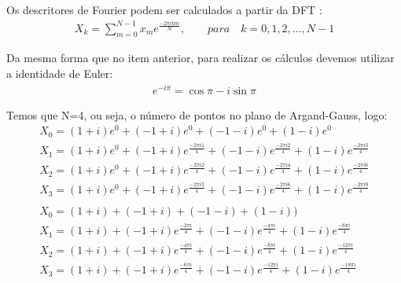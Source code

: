 \documentclass[12pt]{article}
\begin{document}
\begin{itemize}
\begin{itemize}
Os descritores de Fourier podem ser calculados a partir da DFT \cite{broughton2009discrete}:
\begin{align*}
    X_k = \sum\limits_{m=0}^{N-1} x_m e^{\frac{-2\pi ikm}{N}},\qquad para\quad k=0,1,2,...,N-1
\end{align*}

Da mesma forma que no item anterior, para realizar os cálculos devemos utilizar a identidade de Euler:
\begin{align*}
    e^{-i \pi} = \cos \pi - i\sin\pi
\end{align*}
	  
Temos que N=4, ou seja, o número de pontos no plano de Argand-Gauss, logo:
\begin{align*}
    &X_0 = (1 + i)e^0 + (-1 + i)e^0 + (-1 - i)e^0 + (1 - i)e^0 &\\
    &X_1 = (1 + i)e^0 + (-1 + i)e^{\frac{-2\pi i1}{4}} + (-1 - i)e^{\frac{-2\pi i2}{4}} + (1 - i)e^{\frac{-2\pi i3}{4}} &\\
    &X_2 = (1 + i)e^0 + (-1 + i)e^{\frac{-2\pi i2}{4}} + (-1 - i)e^{\frac{-2\pi i4}{4}} + (1 - i)e^{\frac{-2\pi i6}{4}} &\\
    &X_3 = (1 + i)e^0 + (-1 + i)e^{\frac{-2\pi i3}{4}} + (-1 - i)e^{\frac{-2\pi i6}{4}} + (1 - i)e^{\frac{-2\pi i9}{4}} &\\
    \\
    &X_0 = (1 + i) + (-1 + i) + (-1 - i) + (1 - i)) &\\
    &X_1 = (1 + i) + (-1 + i)e^{\frac{-2\pi i}{4}} + (-1 - i)e^{\frac{-4\pi i}{4}} + (1 - i)e^{\frac{-6\pi i}{4}} &\\
    &X_2 = (1 + i) + (-1 + i)e^{\frac{-4\pi i}{4}} + (-1 - i)e^{\frac{-8\pi i}{4}} + (1 - i)e^{\frac{-12\pi i}{4}} &\\
    &X_3 = (1 + i) + (-1 + i)e^{\frac{-6\pi i}{4}} + (-1 - i)e^{\frac{-12\pi i}{4}} + (1 - i)e^{\frac{-18\pi i}{4}} &
\end{align*}


\end{itemize}
\end{itemize}
\end{document}
